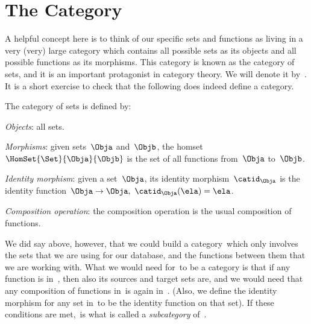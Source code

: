 
\section{The Category \Set}

A helpful concept here is to think of our specific sets and functions as living in a very (very) large category which contains all possible sets as its objects and all possible functions as its morphisms.
This category is known as the category of sets, and it is an important protagonist in category theory.
We will denote it by~\Set.
It is a short exercise to check that the following does indeed define a category.

\begin{ctdefinition}
	\label{def:Set}
	The category of sets \iindex{\Set} is defined by:
	\begin{compactenum}
		\item \emph{Objects}: all sets.
		\item \emph{Morphisms}: given sets~$\Obja$ and~$\Objb$, the homset~$\HomSet{\Set}{\Obja}{\Objb}$ is the set of all functions from~$\Obja$ to~$\Objb$.
		\item \emph{Identity morphism}: given a set~$\Obja$, its identity morphism~$\catid_\Obja$ is the identity function~$\Obja \to \Obja, \ \catid_\Obja(\ela) = \ela$.
		\item \emph{Composition operation}: the composition operation is the usual composition of functions.
	\end{compactenum}
\end{ctdefinition}

We did say above, however, that we could build a category~\Database which only involves the sets that we are using for our database, and the functions between them that we are working with.
What we would need for~\Database to be a category is that if any function is in~\Database, then also its sources and target sets are, and we would need that any composition of functions in~\Database is again in~\Database. (Also, we define the identity morphism for any set in~\Database to be the identity function on that set).
If these conditions are met,~\Database is what is called a \emph{subcategory} of~\Set.